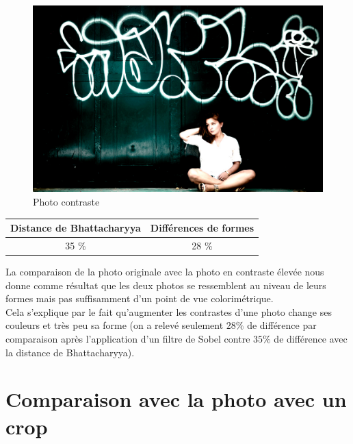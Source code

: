 \documentclass[]{article}
\begin{document}
\begin{figure}[htbp]
\centering
\includegraphics{photos/contraste.jpg}
\caption{Photo contraste}
\end{figure}

\begin{center}
\begin{tabular}{|c|c|}
  \hline
  Distance de Bhattacharyya & Différences de formes \\
  \hline
  35 \% & 28 \% \\
  \hline
\end{tabular}
\end{center}

La comparaison de la photo originale avec la photo en
contraste élevée nous donne comme résultat que les deux photos se
ressemblent au niveau de leurs formes mais pas suffisamment d'un point
de vue colorimétrique. \\
Cela s'explique par le fait qu'augmenter les contrastes d'une photo change ses
couleurs et très peu sa forme (on a relevé seulement $28 \%$ de différence par
comparaison après l'application d'un filtre de Sobel contre $35 \%$ de différence
avec la distance de Bhattacharyya).

\newpage

\section{Comparaison avec la photo avec un
crop}\label{comparaison-avec-la-photo-avec-un-crop}
\end{document}
